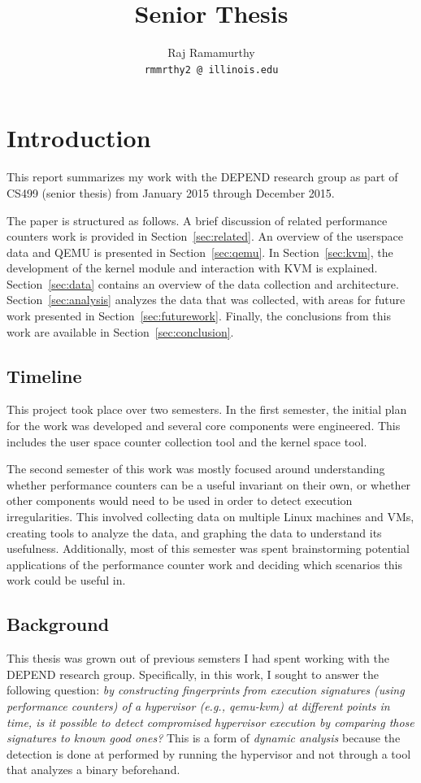 \documentclass[notitlepage]{article}
\begin{document}
\title{Senior Thesis}
\author{Raj Ramamurthy\\
  \texttt{rmmrthy2 @ illinois.edu}}
\maketitle


\section{Introduction}
\label{sec:intro} This report summarizes my work with the DEPEND research group
as part of CS499 (senior thesis) from January 2015 through December 2015.

The paper is structured as follows. A brief discussion of related performance
counters work is provided in Section~\ref{sec:related}. An overview of the
userspace data and QEMU is presented in Section~\ref{sec:qemu}. In
Section~\ref{sec:kvm}, the development of the kernel module and interaction with
KVM is explained. Section~\ref{sec:data} contains an overview of the data
collection and architecture. Section~\ref{sec:analysis} analyzes the data that
was collected, with areas for future work presented in
Section~\ref{sec:futurework}. Finally, the conclusions from this work are
available in Section~\ref{sec:conclusion}.

\subsection{Timeline}
This project took place over two semesters. In the first semester, the initial
plan for the work was developed and several core components were engineered.
This includes the user space counter collection tool and the kernel space tool.

The second semester of this work was mostly focused around understanding whether
performance counters can be a useful invariant on their own, or whether other
components would need to be used in order to detect execution irregularities.
This involved collecting data on multiple Linux machines and VMs, creating tools
to analyze the data, and graphing the data to understand its usefulness.
Additionally, most of this semester was spent brainstorming potential
applications of the performance counter work and deciding which scenarios this
work could be useful in.

\subsection{Background}
This thesis was grown out of previous semsters I had spent working with the
DEPEND research group. Specifically, in this work,  I sought to answer the
following question:
\textit{by constructing fingerprints
    from execution signatures (using performance counters) of a hypervisor
    (e.g., qemu-kvm) at different points in time, is it possible to detect
    compromised hypervisor execution by comparing those signatures to known good ones?} This
    is a form of \textit{dynamic analysis} because the detection is done at
    performed by running the hypervisor and not through a tool that analyzes a
    binary beforehand.
\end{document}
